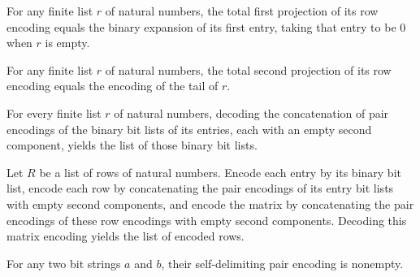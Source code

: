 \begin{theorem}
\label{Complexity.BinArith.pairFstD_encRow}
\leanok
{}
For any finite list $r$ of natural numbers, the total first projection of its row
encoding equals the binary expansion of its first entry, taking that entry to be $0$
when $r$ is empty.
\end{theorem}

\begin{theorem}
\label{Complexity.BinArith.pairSndD_encRow}
\leanok
{}
For any finite list $r$ of natural numbers, the total second projection of its row
encoding equals the encoding of the tail of $r$.
\end{theorem}

\begin{theorem}
\label{Complexity.BinArith.decWords_encRow}
\leanok
{}
For every finite list $r$ of natural numbers, decoding the concatenation of pair
encodings of the binary bit lists of its entries, each with an empty second component,
yields the list of those binary bit lists.
\end{theorem}

\begin{theorem}
\label{Complexity.BinArith.decWords_encMat}
\leanok
{}
Let $R$ be a list of rows of natural numbers. Encode each entry by its binary bit list,
encode each row by concatenating the pair encodings of its entry bit lists with empty
second components, and encode the matrix by concatenating the pair encodings of these
row encodings with empty second components. Decoding this matrix encoding yields the
list of encoded rows.
\end{theorem}

\begin{theorem}
\label{Complexity.BinArith.isNilB_pairEncode}
\leanok
{}
For any two bit strings $a$ and $b$, their self-delimiting pair encoding is nonempty.
\end{theorem}

